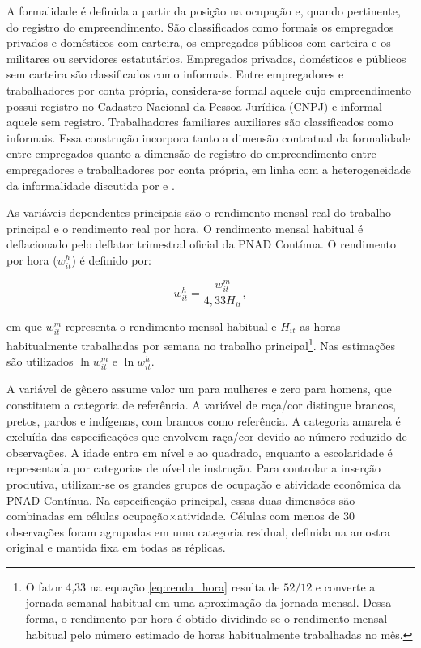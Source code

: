 \documentclass[12pt,a4paper]{article}
\begin{document}
A formalidade é definida a partir da posição na ocupação e, quando pertinente,
do registro do empreendimento. São classificados como formais os empregados
privados e domésticos com carteira, os empregados públicos com carteira e os
militares ou servidores estatutários. Empregados privados, domésticos e públicos
sem carteira são classificados como informais. Entre empregadores e
trabalhadores por conta própria, considera-se formal aquele cujo empreendimento
possui registro no Cadastro Nacional da Pessoa Jurídica (CNPJ) e informal aquele
sem registro. Trabalhadores familiares auxiliares são classificados como
informais. Essa construção incorpora tanto a dimensão contratual da formalidade
entre empregados quanto a dimensão de registro do empreendimento entre
empregadores e trabalhadores por conta própria, em linha com a heterogeneidade
da informalidade discutida por \citet{ulyssea2006} e \citet{ulyssea2018}.

As variáveis dependentes principais são o rendimento mensal real do trabalho
principal e o rendimento real por hora. O rendimento mensal habitual é
deflacionado pelo deflator trimestral oficial da PNAD Contínua. O rendimento por
hora ($w^h_{it}$) é definido por:

\begin{equation}
    w^h_{it}=\frac{w^m_{it}}{4{,}33H_{it}},
    \label{eq:renda_hora}
\end{equation}

\noindent
em que $w^m_{it}$ representa o rendimento mensal habitual e $H_{it}$ as horas
habitualmente trabalhadas por semana no trabalho principal\footnote{O fator 4,33 na equação \ref{eq:renda_hora} resulta de $52/12$ e converte a jornada semanal habitual em uma aproximação da jornada mensal. Dessa forma, o rendimento por hora é obtido dividindo-se o rendimento mensal habitual pelo número estimado de horas habitualmente trabalhadas no mês.}. Nas estimações são
utilizados $\ln w^m_{it}$ e $\ln w^h_{it}$.

A variável de gênero assume valor um para mulheres e zero para homens, que
constituem a categoria de referência. A variável de raça/cor distingue brancos,
pretos, pardos e indígenas, com brancos como referência. A categoria amarela é
excluída das especificações que envolvem raça/cor devido ao número reduzido de
observações. A idade entra em nível e ao quadrado, enquanto a escolaridade é
representada por categorias de nível de instrução. Para controlar a inserção
produtiva, utilizam-se os grandes grupos de ocupação e atividade econômica da
PNAD Contínua. Na especificação principal, essas duas dimensões são combinadas
em células ocupação$\times$atividade. Células com menos de 30 observações foram
agrupadas em uma categoria residual, definida na amostra original e mantida
fixa em todas as réplicas.
\end{document}
